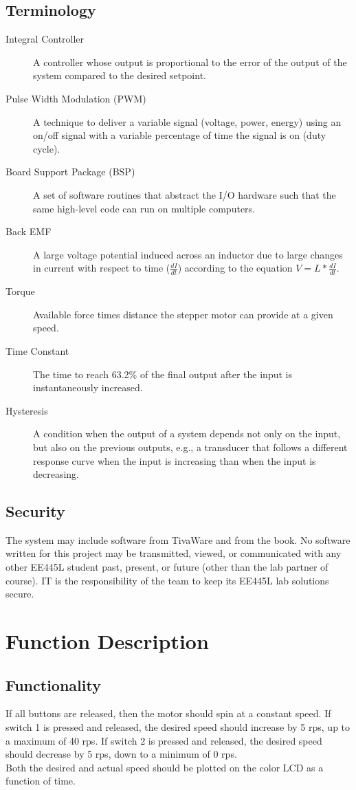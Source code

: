 \documentclass{article}
\begin{document}
	\subsection{Terminology}
		\begin{description}
			\item[Integral Controller]
				A controller whose output is proportional to the error of the output of the system compared to the desired setpoint.
			\item[Pulse Width Modulation (PWM)]
				A technique to deliver a variable signal (voltage, power, energy) using an on/off signal with a variable percentage of time the signal is on (duty cycle).
			\item[Board Support Package (BSP)]
				A set of software routines that abstract the I/O hardware such that the same high-level code can run on multiple computers.
			\item[Back EMF]
				A large voltage potential induced across an inductor due to large changes in current with respect to time ($\frac{dI}{dt}$) according to the equation $V=L*\frac{dI}{dt}$.
			\item[Torque]
				Available force times distance the stepper motor can provide at a given speed.
			\item[Time Constant]
				The time to reach 63.2\% of the final output after the input is instantaneously increased.
			\item[Hysteresis]
				A condition when the output of a system depends not only on the input, but also on the previous outputs, e.g., a transducer that follows a different response curve when the input is increasing than when the input is decreasing.
		\end{description}
	\subsection{Security}
		The system may include software from TivaWare and from the book. No software written for this project may be transmitted, viewed, or communicated with any other EE445L student past, present, or future (other than the lab partner of course). IT is the responsibility of the team to keep its EE445L lab solutions secure.
\section{Function Description}

	\subsection{Functionality}
		If all buttons are released, then the motor should spin at a constant speed. If switch 1 is pressed and released, the desired speed should increase by 5 rps, up to a maximum of 40 rps. If switch 2 is pressed and released, the desired speed should decrease by 5 rps, down to a minimum of 0 rps.\\
		Both the desired and actual speed should be plotted on the color LCD as a function of time.
\end{document}
